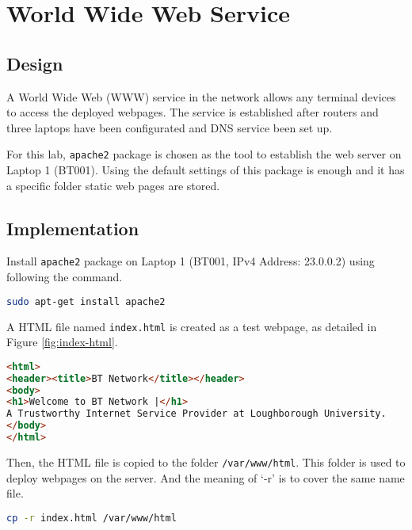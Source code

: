 \section{World Wide Web Service}
\label{sec:web}

\subsection{Design}

A World Wide Web (WWW) service\citep{rfc1630}\citep{rfc2616} in the network allows any terminal devices to access the deployed webpages. The service is established after routers and three laptops have been configurated and DNS service been set up.

For this lab, \texttt{apache2} package is chosen as the tool to establish the web server on Laptop 1 (BT001). 
Using the default settings of this package is enough and it has a specific folder static web pages are stored. 


\subsection{Implementation}

Install \texttt{apache2} package on Laptop 1 (BT001, IPv4 Address: 23.0.0.2) using following the command.

\begin{lstlisting}[language=sh]
sudo apt-get install apache2
\end{lstlisting}

A HTML file named \texttt{index.html} is created as a test webpage, as detailed in Figure \ref{fig:index-html}.

\begin{figure*}[ht!]
\begin{lstlisting}[language=html]
<html>
<header><title>BT Network</title></header>
<body>
<h1>Welcome to BT Network |</h1>
A Trustworthy Internet Service Provider at Loughborough University.
</body>
</html>
\end{lstlisting}
\caption{Contents of HTML File Named \texttt{index.html}}
\label{fig:index-html}
\end{figure*}

Then, the HTML file is copied to the folder \texttt{/var/www/html}. This folder is used to deploy webpages on the server. And the meaning of ‘-r’ is to cover the same name file. 

\begin{lstlisting}[language=sh]
cp -r index.html /var/www/html
\end{lstlisting}

